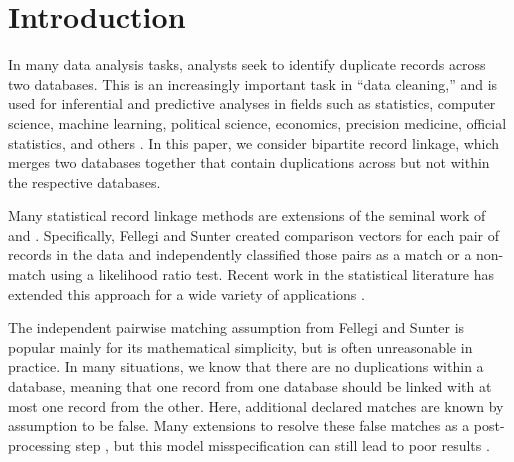 \documentclass[ba]{imsart}
\begin{document}


\section{Introduction}
\label{sec:introduction}
	
	In many data analysis tasks, analysts seek to identify duplicate records across two databases. This is an increasingly important task in ``data cleaning,'' and is used for inferential and predictive analyses in fields such as statistics, computer science, machine learning, political science, economics, precision medicine, official statistics, and others \citep{christen_2012, gutman2013bayesian, dalzell2018regression, tang2020}. In this paper, we consider bipartite record linkage, which merges two databases together that contain duplications across but not within the respective databases. 
	
	Many statistical record linkage methods are extensions of the seminal work of \cite{fellegi_theory_1969} and \cite{newcombe_automatic_1959}. Specifically, Fellegi and Sunter created comparison vectors for each pair of records in the data and independently classified those pairs as a match or a non-match using a likelihood ratio test. Recent work in the statistical literature has extended this approach for a wide variety of applications \citep{winkler1991application, fair2004generalized, wagner2014person, gill2003english, enamorado2019using}. 
	
	The independent pairwise matching assumption from Fellegi and Sunter is popular mainly for its mathematical simplicity, but is often unreasonable in practice. In many situations, we know that there are no duplications within a database, meaning that one record from one database should be linked with at most one record from the other. Here, additional declared matches are known by assumption to be false. Many extensions to \cite{fellegi_theory_1969} resolve these false matches as a post-processing step \citep{jaro1989}, but this model misspecification can still lead to poor results \citep{sadinle_bayesian_2017}.
	
\end{document}
